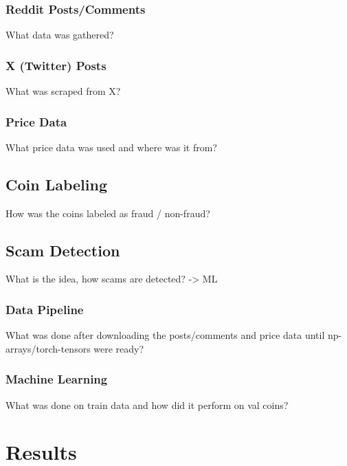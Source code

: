 \documentclass[pdflatex,sn-apa]{sn-jnl}
\begin{document}
\subsubsection{Reddit Posts/Comments}\label{reddit}

What data was gathered?

\subsubsection{X (Twitter) Posts}\label{twitter}

What was scraped from X?

\subsubsection{Price Data}\label{price}

What price data was used and where was it from?

\subsection{Coin Labeling}\label{coin_labeling}

How was the coins labeled as fraud / non-fraud?

\subsection{Scam Detection}\label{scam_detection}

What is the idea, how scams are detected? -> ML

\subsubsection{Data Pipeline}\label{data_pipeline}

What was done after downloading the posts/comments and price data until np-arrays/torch-tensors were ready?

\subsubsection{Machine Learning}\label{machine_learning}

What was done on train data and how did it perform on val coins?

\section{Results}\label{results}
\end{document}
